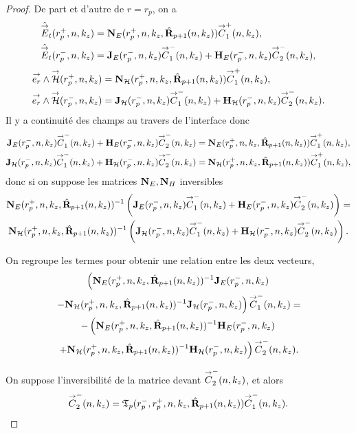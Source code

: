     \begin{proof}
      De part et d'autre de \(r=r_p\), on a 
      \begin{align*}
        \hat{{\overset{\rightarrow}{E}}}_t(r_p^+,n,k_z) &= \mathbf{N}_{E}(r_p^+,n,k_z,\hat{\mathbf{R}}_{p+1}(n,k_z)){\overset{\rightarrow}{C}}_{1}^+(n,k_z),
        \\
        \hat{{\overset{\rightarrow}{E}}}_t(r_p^-,n,k_z) &= \mathbf{J}_E(r_p^-,n,k_z){\overset{\rightarrow}{C}}_{1}^-(n,k_z) + \mathbf{H}_E(r_p^-,n,k_z){\overset{\rightarrow}{C}}_{2}^-(n,k_z),
      \end{align*}
      \begin{align*}
        {\overset{\rightarrow}{e_r}}\wedge{\overset{\rightarrow}{\mathcal{H}}}(r_p^+,n,k_z) &= \mathbf{N}_{\mathcal{H}}(r_p^+,n,k_z,\hat{\mathbf{R}}_{p+1}(n,k_z)){\overset{\rightarrow}{C}}_{1}^+(n,k_z),
        \\
        {\overset{\rightarrow}{e_r}}\wedge{\overset{\rightarrow}{\mathcal{H}}}(r_p^-,n,k_z) &= \mathbf{J}_{\mathcal{H}}(r_p^-,n,k_z){\overset{\rightarrow}{C}}_{1}^-(n,k_z) + \mathbf{H}_{\mathcal{H}}(r_p^-,n,k_z){\overset{\rightarrow}{C}}_{2}^-(n,k_z).
      \end{align*}
      Il y a continuité des champs au travers de l'interface donc
      \begin{align*}
        \mathbf{J}_E(r_p^-,n,k_z){\overset{\rightarrow}{C}}_{1}^-(n,k_z) + \mathbf{H}_E(r_p^-,n,k_z){\overset{\rightarrow}{C}}_{2}^-(n,k_z) &= \mathbf{N}_{E}(r_p^+,n,k_z,\hat{\mathbf{R}}_{p+1}(n,k_z)){\overset{\rightarrow}{C}}_{1}^+(n,k_z),
        \\
        \mathbf{J}_{\mathcal{H}}(r_p^-,n,k_z){\overset{\rightarrow}{C}}_{1}^-(n,k_z) + \mathbf{H}_{\mathcal{H}}(r_p^-,n,k_z){\overset{\rightarrow}{C}}_{2}^-(n,k_z) &= \mathbf{N}_{\mathcal{H}}(r_p^+,n,k_z,\hat{\mathbf{R}}_{p+1}(n,k_z)){\overset{\rightarrow}{C}}_{1}^+(n,k_z),
      \end{align*}
      donc si on suppose les matrices \(\mathbf{N}_E, \mathbf{N}_H\) inversibles
      \begin{multline*}
        \mathbf{N}_{E}(r_p^+,n,k_z,\hat{\mathbf{R}}_{p+1}(n,k_z))^{-1}\left(\mathbf{J}_E(r_p^-,n,k_z){\overset{\rightarrow}{C}}_{1}^-(n,k_z) + \mathbf{H}_E(r_p^-,n,k_z){\overset{\rightarrow}{C}}_{2}^-(n,k_z)\right) =
        \\
        \mathbf{N}_{\mathcal{H}}(r_p^+,n,k_z,\hat{\mathbf{R}}_{p+1}(n,k_z))^{-1}\left(\mathbf{J}_{\mathcal{H}}(r_p^-,n,k_z){\overset{\rightarrow}{C}}_{1}^-(n,k_z) + \mathbf{H}_{\mathcal{H}}(r_p^-,n,k_z){\overset{\rightarrow}{C}}_{2}^-(n,k_z)\right).
      \end{multline*}

      On regroupe les termes pour obtenir une relation entre les deux vecteurs,
      \begin{multline*}
        \left(\mathbf{N}_{E}(r_p^+,n,k_z,\hat{\mathbf{R}}_{p+1}(n,k_z))^{-1}\mathbf{J}_E(r_p^-,n,k_z)
        \right.
        \\
        \left.
        - \mathbf{N}_{\mathcal{H}}(r_p^+,n,k_z,\hat{\mathbf{R}}_{p+1}(n,k_z))^{-1}\mathbf{J}_{\mathcal{H}}(r_p^-,n,k_z)\right){\overset{\rightarrow}{C}}_{1}^-(n,k_z) =
        \\
        -\left(\mathbf{N}_{E}(r_p^+,n,k_z,\hat{\mathbf{R}}_{p+1}(n,k_z))^{-1}\mathbf{H}_E(r_p^-,n,k_z)
        \right. 
        \\
        \left.
        + \mathbf{N}_{\mathcal{H}}(r_p^+,n,k_z,\hat{\mathbf{R}}_{p+1}(n,k_z))^{-1}\mathbf{H}_{\mathcal{H}}(r_p^-,n,k_z)\right){\overset{\rightarrow}{C}}_{2}^-(n,k_z).
      \end{multline*}

      On suppose l'inversibilité de la matrice devant \({\overset{\rightarrow}{C}}_{2}^-(n,k_z)\), et alors
      \begin{equation*}
        {\overset{\rightarrow}{C}}_{2}^-(n,k_z) = \mathfrak{T}_p(r_p^-,r_p^+,n,k_z,\hat{\mathbf{R}}_{p+1}(n,k_z)) {\overset{\rightarrow}{C}}_{1}^-(n,k_z).
      \end{equation*}
    \end{proof}

